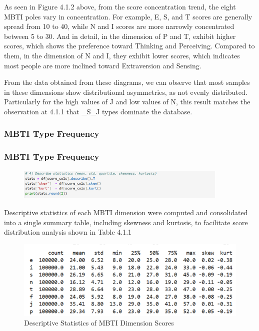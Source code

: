\documentclass[12pt]{article}
\begin{document}
	As seen in Figure 4.1.2 above, from the score concentration trend, the eight MBTI poles vary in concentration. For example, E, S, and T scores are generally spread from 10 to 40, while N and I scores are more narrowly concentrated between 5 to 30. And in detail, in the dimension of P and T, exhibit higher scores, which shows the preference toward Thinking and Perceiving. Compared to them, in the dimension of N and I, they exhibit lower scores, which indicates most people are more inclined toward Extraversion and Sensing.
	
	From the data obtained from these diagrams, we can observe that most samples in these dimensions show distributional asymmetries, as not evenly distributed. Particularly for the high values of J and low values of N, this result matches the observation at 4.1.1 that \_S\_J types dominate the database.
	
	\subsubsection{MBTI Type Frequency}
	\subsubsection{MBTI Type Frequency}
	\begin{figure}[H]
	\centering
	\includegraphics[width=0.9\textwidth]{Q1EDA5}
	
	\end{figure}	
	
	Descriptive statistics of each MBTI dimension were computed and consolidated into a single summary table, including skewness and kurtosis, to facilitate score distribution analysis shown in Table 4.1.1
	\begin{figure}[H]
		\centering
		\includegraphics{Q1EDA6} 
		\caption{Descriptive Statistics of MBTI Dimension Scores}		
	\end{figure}
	
\end{document}
